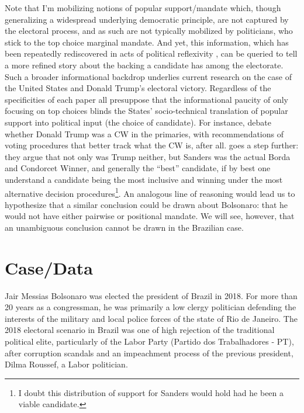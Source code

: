 \documentclass[hidelinks,11pt]{article}
\begin{document}
Note that I'm mobilizing notions of popular support/mandate which, though
generalizing a widespread underlying democratic principle, are not captured by
the electoral process, and as such are not typically mobilized by politicians,
who stick to the top choice marginal mandate. And yet, this information, which
has been repeatedly rediscovered in acts of political reflexivity
\parencite{mclean14_stran_histor_social_choic_contr}, can be queried to tell a
more refined story about the backing a candidate has among the electorate. Such
a broader informational backdrop underlies current research on the case of the
United States and Donald Trump's electoral victory. Regardless of the
specificities of each paper all presuppose that the informational paucity of
only focusing on top choices blinds the States' socio-technical translation of
popular support into political input (the choice of candidate). For instance,
\textcite{potthoff2021condorcet, woon2020trump, kurrild2018trump} debate whether
Donald Trump was a CW in the primaries, with recommendations of voting
procedures that better track what the CW is, after all.
\textcite{igersheim22_compar_votin_method} goes a step further: they argue that
not only was Trump neither, but Sanders was the actual Borda and Condorcet
Winner, and generally the ``best'' candidate, if by best one understand a
candidate being the most inclusive and winning under the most alternative
decision procedures\footnote{I doubt this distribution of support for Sanders
  would hold had he been a viable candidate.}. An analogous line of reasoning
would lead us to hypothesize that a similar conclusion could be drawn about
Bolsonaro: that he would not have either pairwise or positional mandate. We will
see, however, that an unambiguous conclusion cannot be drawn in the Brazilian
case.

\section{Case/Data}

Jair Messias Bolsonaro was elected the president of Brazil in 2018. For more
than 20 years as a congressman, he was primarily a low clergy politician
defending the interests of the military and local police forces of the state of
Rio de Janeiro. The 2018 electoral scenario in Brazil was one of high rejection
of the traditional political elite, particularly of the Labor Party (Partido
dos Trabalhadores - PT), after corruption scandals and an impeachment process of
the previous president, Dilma Roussef, a Labor politician.
\end{document}
